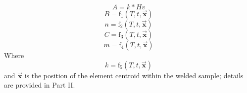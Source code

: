 \begin{equation}
\label{eq2}
A=k*Hv %
\end{equation}
\begin{equation}
\label{eq4}
B=\text{f}_1(T,t,\vec{\textbf{x}})
\end{equation}
\begin{equation}
\label{eq5}
n=\text{f}_2(T,t,\vec{\textbf{x}})
\end{equation}
\begin{equation}
\label{eq6}
C=\text{f}_3(T,t,\vec{\textbf{x}})
\end{equation}
\begin{equation}
\label{eq7}
m=\text{f}_4(T,t,\vec{\textbf{x}})
\end{equation}
Where
\begin{equation}
\label{eq3}
k=\text{f}_5(T,t,\vec{\textbf{x}})
\end{equation}
and $\vec{\textbf{x}}$ is the position of the element centroid within the welded sample; details are provided in Part II.

